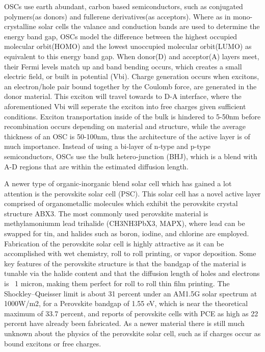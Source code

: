 	
	OSCs use earth abundant, carbon based semiconductors, such as conjugated polymers(as donors) and fullerene derivatives(as acceptors). Where as in mono-crystalline solar cells the valance and conduction bands are used to determine the energy band gap, OSCs model the difference between the highest occupied molecular orbit(HOMO) and the lowest unoccupied molecular orbit(LUMO) as equivalent to this energy band gap. When donor(D) and acceptor(A) layers meet, their Fermi levels match up and band bending occurs, which creates a small electric field, or built in potential (Vbi). Charge generation occurs when excitons, an electron/hole pair bound together by the Coulomb force, are generated in the donor material. This exciton will travel towards to D-A interface, where the aforementioned Vbi will seperate the exciton into free charges given sufficient conditions.  Exciton transportation inside of the bulk is hindered to 5-50nm before recombination occurs depending on material and structure, while the average thickness of an OSC is 50-100nm, thus the architecture of the active layer is of much importance. Instead of using a bi-layer of n-type and p-type semiconductors, OSCs use the bulk hetero-junction (BHJ), which is a blend with A-D regions that are within the estimated diffusion length.  
	
A newer type of organic-inorganic blend solar cell which has gained a lot  attention is the perovskite solar cell (PSC). This solar cell has a novel active layer comprised of organometallic molecules which exhibit the perovskite crystal structure ABX3. The most commonly used perovskite material is methylamoniumm lead trihalide (CH3NH3PbX3, MAPX), where lead can be swapped for tin, and halides such as boron, iodine, and chlorine are employed. Fabrication of the perovskite solar cell is highly attractive as it can be accomplished with wet chemistry, roll to roll printing, or vapor deposition. Some key features of the perovskite structure is that the bandgap of the material is tunable via the halide content and that the diffusion length of holes and electrons is ~1 micron, making them perfect for roll to roll thin film printing. The Shockley–Queisser limit is about 31 percent under an AM1.5G solar spectrum at 1000W/m2, for a Perovskite bandgap of 1.55 eV, which is near the theoretical maximum of 33.7 percent, and reports of perovskite cells with PCE as high as 22 percent have already been fabricated. As a newer material there is still much unknown about the physics of the perovskite solar cell, such as if charges occur as bound excitons or free charges.


